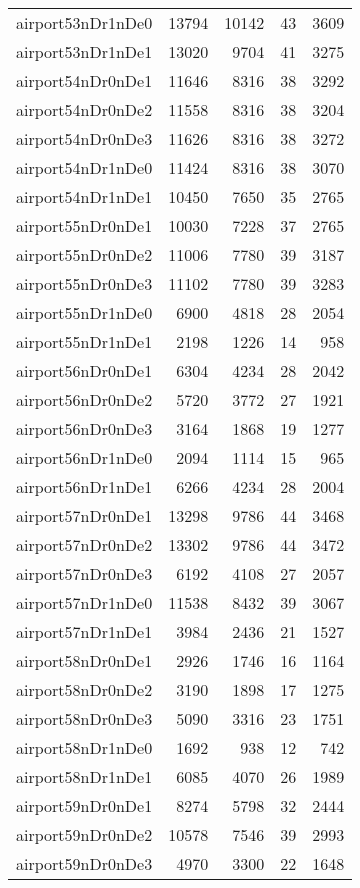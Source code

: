 \begin{tabular}{lrrrr}
airport53nDr1nDe0 & 13794 & 10142 & 43 & 3609 \\
airport53nDr1nDe1 & 13020 & 9704 & 41 & 3275 \\
airport54nDr0nDe1 & 11646 & 8316 & 38 & 3292 \\
airport54nDr0nDe2 & 11558 & 8316 & 38 & 3204 \\
airport54nDr0nDe3 & 11626 & 8316 & 38 & 3272 \\
airport54nDr1nDe0 & 11424 & 8316 & 38 & 3070 \\
airport54nDr1nDe1 & 10450 & 7650 & 35 & 2765 \\
airport55nDr0nDe1 & 10030 & 7228 & 37 & 2765 \\
airport55nDr0nDe2 & 11006 & 7780 & 39 & 3187 \\
airport55nDr0nDe3 & 11102 & 7780 & 39 & 3283 \\
airport55nDr1nDe0 & 6900 & 4818 & 28 & 2054 \\
airport55nDr1nDe1 & 2198 & 1226 & 14 & 958 \\
airport56nDr0nDe1 & 6304 & 4234 & 28 & 2042 \\
airport56nDr0nDe2 & 5720 & 3772 & 27 & 1921 \\
airport56nDr0nDe3 & 3164 & 1868 & 19 & 1277 \\
airport56nDr1nDe0 & 2094 & 1114 & 15 & 965 \\
airport56nDr1nDe1 & 6266 & 4234 & 28 & 2004 \\
airport57nDr0nDe1 & 13298 & 9786 & 44 & 3468 \\
airport57nDr0nDe2 & 13302 & 9786 & 44 & 3472 \\
airport57nDr0nDe3 & 6192 & 4108 & 27 & 2057 \\
airport57nDr1nDe0 & 11538 & 8432 & 39 & 3067 \\
airport57nDr1nDe1 & 3984 & 2436 & 21 & 1527 \\
airport58nDr0nDe1 & 2926 & 1746 & 16 & 1164 \\
airport58nDr0nDe2 & 3190 & 1898 & 17 & 1275 \\
airport58nDr0nDe3 & 5090 & 3316 & 23 & 1751 \\
airport58nDr1nDe0 & 1692 & 938 & 12 & 742 \\
airport58nDr1nDe1 & 6085 & 4070 & 26 & 1989 \\
airport59nDr0nDe1 & 8274 & 5798 & 32 & 2444 \\
airport59nDr0nDe2 & 10578 & 7546 & 39 & 2993 \\
airport59nDr0nDe3 & 4970 & 3300 & 22 & 1648 \\

\end{tabular}
